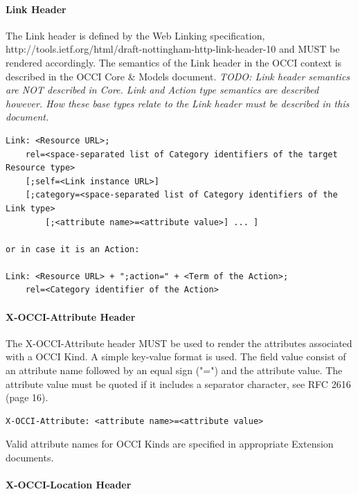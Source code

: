 \documentclass[10pt,a4paper]{article}
\begin{document}
\paragraph{Link Header}

The Link header is defined by the Web Linking specification, http://tools.ietf.org/html/draft-nottingham-http-link-header-10 and MUST be rendered accordingly. The semantics of the Link header in the OCCI context is described in the OCCI Core \& Models document.
\emph{TODO: Link header semantics are NOT described in Core. Link and Action type semantics are described however. How these base types relate to the Link header must be described in this document.}

\begin{verbatim}
Link: <Resource URL>;
    rel=<space-separated list of Category identifiers of the target Resource type>
    [;self=<Link instance URL>]
    [;category=<space-separated list of Category identifiers of the Link type>
        [;<attribute name>=<attribute value>] ... ]

or in case it is an Action:

Link: <Resource URL> + ";action=" + <Term of the Action>;
    rel=<Category identifier of the Action>
\end{verbatim}

\paragraph{X-OCCI-Attribute Header}

The X-OCCI-Attribute header MUST be used to render the attributes associated with a OCCI Kind. A simple key-value format is used. The field value consist of an attribute name followed by an equal sign ("=") and the attribute value. The attribute value must be quoted if it includes a separator character, see RFC 2616 (page 16).

\begin{verbatim}
X-OCCI-Attribute: <attribute name>=<attribute value>
\end{verbatim}

Valid attribute names for OCCI Kinds are specified in appropriate Extension documents.

\paragraph{X-OCCI-Location Header}
\end{document}
